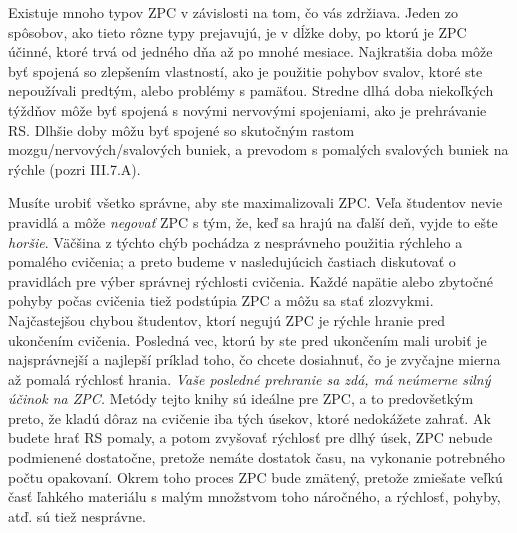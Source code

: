 Existuje mnoho typov ZPC v závislosti na tom, čo vás zdržiava. Jeden zo spôsobov, ako tieto rôzne typy prejavujú, je v dĺžke doby, po ktorú je ZPC účinné, ktoré trvá od jedného dňa až po mnohé mesiace. Najkratšia doba môže byť spojená so zlepšením vlastností, ako je použitie pohybov svalov, ktoré ste nepoužívali predtým, alebo problémy s pamäťou. Stredne dlhá doba niekoľkých týždňov môže byť spojená s novými nervovými spojeniami, ako je prehrávanie RS. Dlhšie doby môžu byť spojené so skutočným rastom mozgu/nervových/svalových buniek, a prevodom s pomalých svalových buniek na rýchle (pozri III.7.A).

Musíte urobiť všetko správne, aby ste maximalizovali ZPC. Veľa študentov nevie pravidlá a môže \textit{negovať} ZPC s tým, že, keď sa hrajú na ďalší deň, vyjde to ešte \textit{horšie}. Väčšina z týchto chýb pochádza z nesprávneho použitia rýchleho a pomalého cvičenia; a preto budeme v nasledujúcich častiach diskutovať o pravidlách pre výber správnej rýchlosti cvičenia. Každé napätie alebo zbytočné pohyby počas cvičenia tiež podstúpia ZPC a môžu sa stať zlozvykmi. Najčastejšou chybou študentov, ktorí negujú ZPC je rýchle hranie pred ukončením cvičenia. Posledná vec, ktorú by ste pred ukončením mali urobiť je najsprávnejší a najlepší príklad toho, čo chcete dosiahnuť, čo je  zvyčajne mierna až pomalá rýchlosť hrania. \emph{Vaše posledné prehranie sa zdá, má neúmerne silný účinok na ZPC.} Metódy tejto knihy sú ideálne pre ZPC, a to predovšetkým preto, že kladú dôraz na cvičenie iba tých úsekov, ktoré nedokážete zahrať. Ak budete hrať RS pomaly, a potom zvyšovať rýchlosť pre dlhý úsek, ZPC nebude podmienené dostatočne, pretože nemáte dostatok času, na vykonanie  potrebného počtu opakovaní. Okrem toho proces ZPC bude zmätený, pretože zmiešate veľkú časť ľahkého materiálu s malým množstvom toho náročného, a rýchlosť, pohyby, atď. sú tiež nesprávne.

